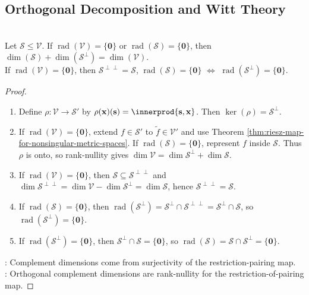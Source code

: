 \subsection{Orthogonal Decomposition and Witt Theory}

\begin{theorem} \label{thm:metric-orthogonal-complement-dimension} \\
Let $\mathcal{S}\leq\mathcal{V}$. If $\operatorname{rad}(\mathcal{V})=\{\mathbf{0}\}$ or $\operatorname{rad}(\mathcal{S})=\{\mathbf{0}\}$, then $\dim(\mathcal{S})+\dim(\mathcal{S}^{\perp})=\dim(\mathcal{V})$.\\
If $\operatorname{rad}(\mathcal{V})=\{\mathbf{0}\}$, then $\mathcal{S}^{\perp\perp}=\mathcal{S}$, $\operatorname{rad}(\mathcal{S})=\{\mathbf{0}\}$ $\Longleftrightarrow$ $\operatorname{rad}(\mathcal{S}^{\perp})=\{\mathbf{0}\}$.
\begin{proof}
\begin{enumerate}[label=\roman*.]
\setlength{\itemsep}{0pt}
\item Define $\rho:\mathcal{V}\to\mathcal{S}'$ by $\rho(\mathbf{x})(\mathbf{s})=\innerprod{\mathbf{s},\mathbf{x}}$. Then $\ker(\rho)=\mathcal{S}^{\perp}$.
\item If $\operatorname{rad}(\mathcal{V})=\{\mathbf{0}\}$, extend $f\in\mathcal{S}'$ to $\widetilde f\in\mathcal{V}'$ and use Theorem \ref{thm:riesz-map-for-nonsingular-metric-spaces}. If $\operatorname{rad}(\mathcal{S})=\{\mathbf{0}\}$, represent $f$ inside $\mathcal{S}$. Thus $\rho$ is onto, so rank-nullity gives $\dim\mathcal{V}=\dim\mathcal{S}^{\perp}+\dim\mathcal{S}$.
\item If $\operatorname{rad}(\mathcal{V})=\{\mathbf{0}\}$, then $\mathcal{S}\subseteq\mathcal{S}^{\perp\perp}$ and $\dim\mathcal{S}^{\perp\perp} =\dim\mathcal{V}-\dim\mathcal{S}^{\perp} =\dim\mathcal{S}$, hence $\mathcal{S}^{\perp\perp}=\mathcal{S}$.
\item[$(\Rightarrow)$] If $\operatorname{rad}(\mathcal{S})=\{\mathbf{0}\}$, then $\operatorname{rad}(\mathcal{S}^{\perp})=\mathcal{S}^{\perp}\cap\mathcal{S}^{\perp\perp} =\mathcal{S}^{\perp}\cap\mathcal{S}$, so $\operatorname{rad}(\mathcal{S}^{\perp})=\{\mathbf{0}\}$.
\item[$(\Leftarrow)$] If $\operatorname{rad}(\mathcal{S}^{\perp})=\{\mathbf{0}\}$, then $\mathcal{S}^{\perp}\cap\mathcal{S}=\{\mathbf{0}\}$, so $\operatorname{rad}(\mathcal{S})=\mathcal{S}\cap\mathcal{S}^{\perp}=\{\mathbf{0}\}$.
\end{enumerate}
: Complement dimensions come from surjectivity of the restriction-pairing map.\\
: Orthogonal complement dimensions are rank-nullity for the restriction-of-pairing map.
\end{proof}
\end{theorem}

